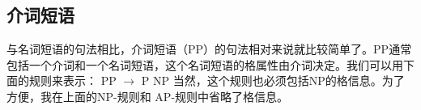\subsection{介词短语}
\label{Abschnitt-PP-Syntax}
与名词短语的句法相比，介词短语（PP）的句法相对来说就比较简单了。PP通常包括一个介词和一个名词短语，这个名词短语的格属性由介词决定。我们可以用下面的规则来表示：
\ea
\label{Regel-PP-einfach}
PP $\to$ P NP
\z
当然，这个规则也必须包括NP的格信息。为了方便，我在上面的NP-规则和 AP-规则中省略了格信息。

